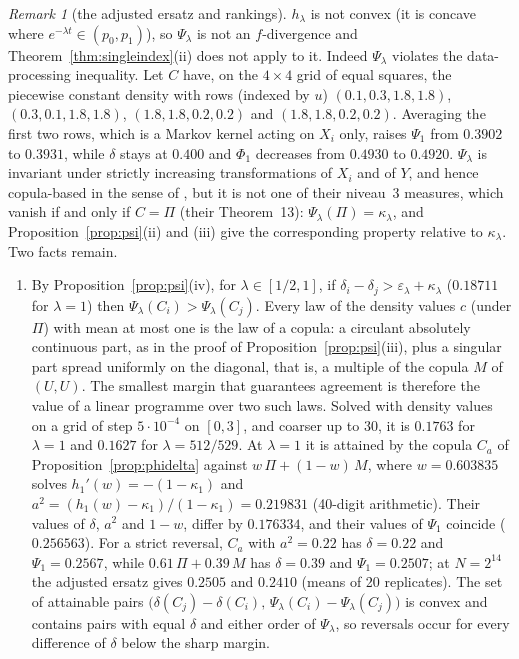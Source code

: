 \documentclass[11pt,a4paper]{article}
\theoremstyle{definition}
\theoremstyle{remark}
\newtheorem{remark}[theorem]{Remark}
\begin{document}
\begin{remark}[the adjusted ersatz and rankings]\label{rem:psirank}
$h_\lambda$ is not convex (it is concave where $e^{-\lambda t}\in(p_0,p_1)$), so $\Psi_\lambda$ is not an $f$-divergence and Theorem~\ref{thm:singleindex}(ii) does not apply to it. Indeed $\Psi_\lambda$ violates the data-processing inequality. Let $C$ have, on the $4\times4$ grid of equal squares, the piecewise constant density with rows (indexed by $u$) $(0.1,0.3,1.8,1.8)$, $(0.3,0.1,1.8,1.8)$, $(1.8,1.8,0.2,0.2)$ and $(1.8,1.8,0.2,0.2)$. Averaging the first two rows, which is a Markov kernel acting on $X_i$ only, raises $\Psi_1$ from $0.3902$ to $0.3931$, while $\delta$ stays at $0.400$ and $\Phi_1$ decreases from $0.4930$ to $0.4920$. $\Psi_\lambda$ is invariant under strictly increasing transformations of $X_i$ and of $Y$, and hence copula-based in the sense of \citet[Table~1]{plischke2019}, but it is not one of their niveau~3 measures, which vanish if and only if $C=\Pi$ (their Theorem~13): $\Psi_\lambda(\Pi)=\kappa_\lambda$, and Proposition~\ref{prop:psi}(ii) and (iii) give the corresponding property relative to $\kappa_\lambda$. Two facts remain.
\begin{enumerate}[label=(\alph*)]
\item By Proposition~\ref{prop:psi}(iv), for $\lambda\in[1/2,1]$, if $\delta_i-\delta_j>\varepsilon_\lambda+\kappa_\lambda$ ($0.18711$ for $\lambda=1$) then $\Psi_\lambda(C_i)>\Psi_\lambda(C_j)$. Every law of the density values $c$ (under $\Pi$) with mean at most one is the law of a copula: a circulant absolutely continuous part, as in the proof of Proposition~\ref{prop:psi}(iii), plus a singular part spread uniformly on the diagonal, that is, a multiple of the copula $M$ of $(U,U)$. The smallest margin that guarantees agreement is therefore the value of a linear programme over two such laws. Solved with density values on a grid of step $5\cdot10^{-4}$ on $[0,3]$, and coarser up to $30$, it is $0.1763$ for $\lambda=1$ and $0.1627$ for $\lambda=512/529$. At $\lambda=1$ it is attained by the copula $C_a$ of Proposition~\ref{prop:phidelta} against $w\,\Pi+(1-w)\,M$, where $w=0.603835$ solves $h_1'(w)=-(1-\kappa_1)$ and $a^2=(h_1(w)-\kappa_1)/(1-\kappa_1)=0.219831$ (40-digit arithmetic). Their values of $\delta$, $a^2$ and $1-w$, differ by $0.176334$, and their values of $\Psi_1$ coincide ($0.256563$). For a strict reversal, $C_a$ with $a^2=0.22$ has $\delta=0.22$ and $\Psi_1=0.2567$, while $0.61\,\Pi+0.39\,M$ has $\delta=0.39$ and $\Psi_1=0.2507$; at $N=2^{14}$ the adjusted ersatz gives $0.2505$ and $0.2410$ (means of 20 replicates). The set of attainable pairs $\big(\delta(C_j)-\delta(C_i),\,\Psi_\lambda(C_i)-\Psi_\lambda(C_j)\big)$ is convex and contains pairs with equal $\delta$ and either order of $\Psi_\lambda$, so reversals occur for every difference of $\delta$ below the sharp margin.

\end{enumerate}
\end{remark}
\end{document}
